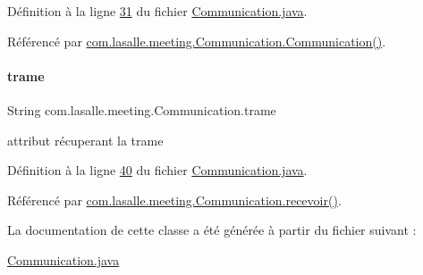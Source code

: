 Définition à la ligne \hyperlink{_communication_8java_source_l00031}{31} du fichier \hyperlink{_communication_8java_source}{Communication.\+java}.



Référencé par \hyperlink{_communication_8java_source_l00056}{com.\+lasalle.\+meeting.\+Communication.\+Communication()}.

\mbox{\label{classcom_1_1lasalle_1_1meeting_1_1_communication_a1c5c3782ce80717dab95ed5335929333}} 
\paragraph{\texorpdfstring{trame}{trame}}
{\footnotesize\ttfamily String com.\+lasalle.\+meeting.\+Communication.\+trame\hspace{0.3cm}{\ttfamily [private]}}



attribut récuperant la trame 



Définition à la ligne \hyperlink{_communication_8java_source_l00040}{40} du fichier \hyperlink{_communication_8java_source}{Communication.\+java}.



Référencé par \hyperlink{_communication_8java_source_l00123}{com.\+lasalle.\+meeting.\+Communication.\+recevoir()}.



La documentation de cette classe a été générée à partir du fichier suivant \+:\begin{DoxyCompactItemize}
\item 
\hyperlink{_communication_8java}{Communication.\+java}\end{DoxyCompactItemize}
